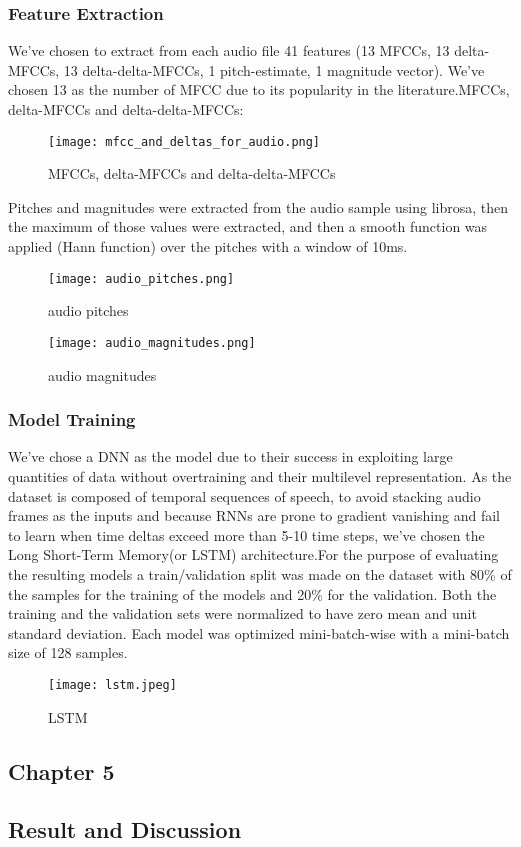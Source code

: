 \documentclass[a4paper,12pt]{article}
\begin{document}
\subsection{Feature Extraction}
{
We've chosen to extract from each audio file 41 features (13 MFCCs, 13 delta-MFCCs, 13 delta-delta-MFCCs, 1 pitch-estimate, 1 magnitude vector). We've chosen 13 as the number of MFCC due to its popularity in the literature.MFCCs, delta-MFCCs and delta-delta-MFCCs:}
\begin{figure}
    \centering
    \texttt{[image: mfcc\_and\_deltas\_for\_audio.png]}
    \caption{MFCCs, delta-MFCCs and delta-delta-MFCCs}
    \label{fig:my_label}
\end{figure}
{Pitches and magnitudes were extracted from the audio sample using librosa, then the maximum of those values were extracted, and then a smooth function was applied (Hann function) over the pitches with a window of 10ms.}
\begin{figure}
    \centering
    \texttt{[image: audio\_pitches.png]}
    \caption{audio pitches}
    \label{fig:my_label}
\end{figure}
\begin{figure}
    \centering
    \texttt{[image: audio\_magnitudes.png]}
    \caption{audio magnitudes}
    \label{fig:my_label}
\end{figure}
\subsection{Model Training}
We've chose a DNN as the model due to their success in exploiting large quantities of data without overtraining and their multilevel representation. As the dataset is composed of temporal sequences of speech, to avoid stacking audio frames as the inputs and because RNNs are prone to gradient vanishing and fail to learn when time deltas exceed more than 5-10 time steps, we've chosen the Long Short-Term Memory(or LSTM) architecture.For the purpose of evaluating the resulting models a train/validation split was made on the dataset with 80\% of the samples for the training of the models and 20\% for the validation. Both the training and the validation sets were normalized to have zero mean and unit standard deviation. Each model was optimized mini-batch-wise with a mini-batch size of 128 samples.
\begin{figure}
    \centering
    \texttt{[image: lstm.jpeg]}
    \caption{LSTM}
    \label{fig:my_label}
\end{figure}
\pagebreak
\begin{center}
\chapter{\textbf{Chapter 5}}
    \section{Result and Discussion}
\end{center}
\end{document}
